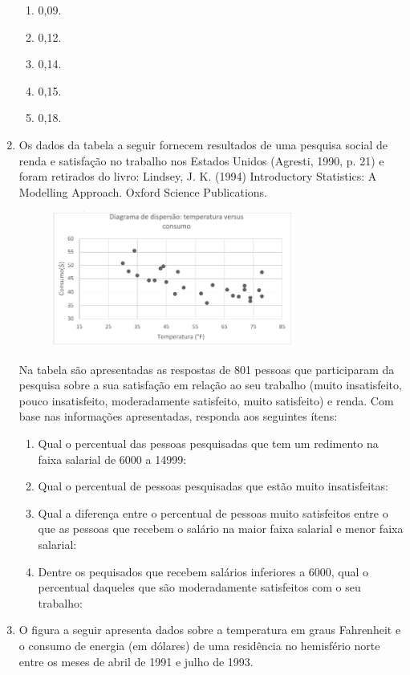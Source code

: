 \documentclass[twocolumn,oneside,a4paper,10pt]{article}
\begin{document}
\begin{enumerate}
\begin{enumerate}
    \item 0,09.
    \item 0,12.
   	\item 0,14.
    \item 0,15.
    \item 0,18.
\end{enumerate}

\item Os dados da tabela a seguir fornecem resultados de uma pesquisa social de renda e satisfação no trabalho nos Estados Unidos (Agresti, 1990, p. 21) e foram retirados do livro: Lindsey, J. K. (1994) Introductory Statistics: A Modelling Approach. Oxford Science Publications.

\begin{figure}[!htb]
\center
\includegraphics[width=8cm]{Figuras/g14.png}
\end{figure}

Na tabela são apresentadas as respostas de 801 pessoas que participaram da pesquisa sobre a sua satisfação em relação ao seu trabalho (muito insatisfeito, pouco insatisfeito, moderadamente satisfeito, muito satisfeito) e renda. Com base nas informações apresentadas, responda aos seguintes ítens:
	\begin{enumerate}
	\item Qual o percentual das pessoas pesquisadas que tem um redimento na faixa salarial de 6000 a 14999:
	\item Qual o percentual de pessoas pesquisadas que estão muito insatisfeitas:
	\item Qual a diferença entre o percentual de pessoas muito satisfeitos entre o que as pessoas que recebem o salário na maior faixa salarial e menor faixa salarial:
	\item Dentre os pequisados que recebem salários inferiores a 6000, qual o percentual daqueles que são moderadamente satisfeitos com o seu trabalho:
	\end{enumerate}

\item O figura a seguir apresenta dados sobre a temperatura em graus Fahrenheit e o consumo de energia (em dólares) de uma residência no hemisfério norte entre os meses de abril de 1991 e julho de 1993.


\end{enumerate}
\end{document}
